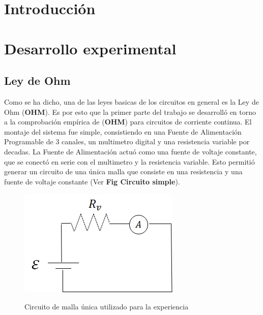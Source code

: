 \documentclass[11pt,a4paper]{article}
\begin{document}
\section{Introducción}\label{sec:intro}
	


\section{Desarrollo experimental}

\subsection{Ley de Ohm}

Como se ha dicho, una de las leyes basicas de los circuitos en general es la Ley de Ohm (\textbf{OHM}). Es por esto que la primer parte del trabajo se desarrolló en torno a la comprobación empírica de (\textbf{OHM}) para circuitos de corriente continua. El montaje del sistema fue simple, consistiendo en una Fuente de Alimentación Programable de 3 canales, un multimetro digital y una resistencia variable por decadas. La Fuente de Alimentación actuó como una fuente de voltaje constante, que se conectó en serie con el multimetro y la resistencia variable. Esto permitió generar un circuito de una única malla que consiste en una resistencia y una fuente de voltaje constante (Ver \textbf{Fig Circuito simple}). 


\begin{figure}[h]
  \centering
  \includegraphics[scale=1]{Circuito_simple}
  \label{fig:circ_simp}
  \caption{Circuito de malla única utilizado para la experiencia}
\end{figure}
\end{document}
